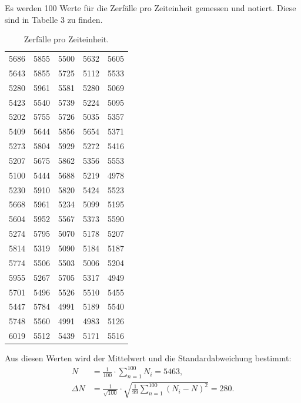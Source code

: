 Es werden 100 Werte für die Zerfälle pro Zeiteinheit gemessen und notiert. Diese sind in Tabelle 3 zu finden.
\begin{table}[H]
  \centering
  \caption{Zerfälle pro Zeiteinheit.}
  \label{tab:Parameter}
  \begin{tabular}{c c c c c}
    \bottomrule
     5686&5855 &5500&5632&5605 \\
     5643&5855 &5725   &5112&5533 \\
     5280&5961  &5581  &5280&5069 \\
     5423&5540  &5739  &5224 &5095 \\
     5202&5755  &5726  &5035 &5357 \\
     5409&5644  &5856  &5654   &5371 \\
     5273&5804  &5929  &5272     &5416 \\
     5207&5675  &5862  &5356     &5553 \\
     5100&5444  &5688  &5219     &4978 \\
     5230&5910  &5820  &5424     &5523 \\
     5668&5961  &5234  &5099     &5195 \\
     5604&5952  &5567  &5373     &5590 \\
     5274&5795  &5070  &5178     &5207 \\
     5814&5319  &5090  &5184     &5187 \\
     5774&5506  &5503  &5006     &5204 \\
     5955&5267  &5705  &5317     &4949 \\
     5701&5496  &5526  &5510 &5455 \\
     5447&5784  &4991  &5189     &5540 \\
     5748&5560  &4991  &4983     &5126 \\
     6019&5512  &5439  &5171     &5516 \\
  \bottomrule
  \end{tabular}
\end{table}

\noindent Aus diesen Werten wird der Mittelwert und die Standardabweichung bestimmt:
\begin{align*}
N &= \frac{1}{100}\cdot \sum_{n=1}^{100} N_i = 5463, \\
\Delta N &=\frac{1}{\sqrt{100}} \cdot \sqrt{\frac{1}{99} \sum_{n=1}^{100} (N_i - N)^2} = 280.
\end{align*}

